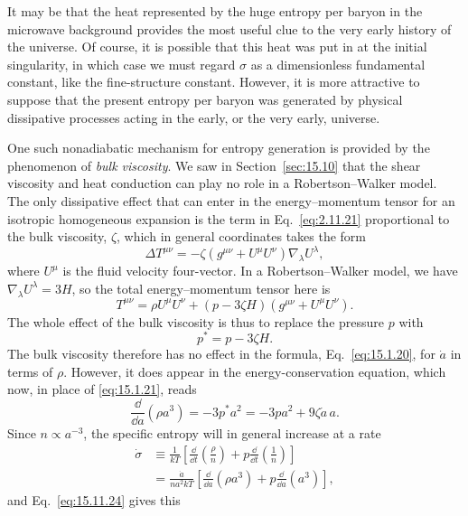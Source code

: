 It may be that the heat represented by the huge entropy per baryon in the
microwave background provides the most useful clue to the very early history of
the universe. Of course, it is possible that this heat was put in at the initial
singularity, in which case we must regard \(\sigma\) as a dimensionless
fundamental constant, like the fine-structure constant. However, it is more
attractive to suppose that the present entropy per baryon was generated by
physical dissipative processes acting in the early, or the very early,
universe.

One such nonadiabatic mechanism for entropy generation is provided by the
phenomenon of \emph{bulk viscosity}. We saw in
Section~\ref{sec:15.10} that the shear viscosity and heat conduction can play
no role in a Robertson--Walker model. The only dissipative effect that can
enter in the energy--momentum tensor for an isotropic homogeneous expansion is
the term in Eq.~\eqref{eq:2.11.21} proportional to the bulk viscosity,
\(\zeta\), which in general coordinates takes the form
\[
  \Delta T^{\mu\nu}
  =
  -\zeta(g^{\mu\nu}+U^\mu U^\nu)\nabla_\lambda U^\lambda,
\]
where \(U^\mu\) is the fluid velocity four-vector. In a
Robertson--Walker model, we have \(\nabla_\lambda U^\lambda=3H\), so the
total energy--momentum tensor here is
\[
  T^{\mu\nu}
  =
  \rho U^\mu U^\nu
  +(p-3\zeta H)(g^{\mu\nu}+U^\mu U^\nu).
\]
The whole effect of the bulk viscosity is thus to replace the pressure \(p\)
with
\begin{equation}
  p^*=p-3\zeta H.
  \tag{15.11.23}\label{eq:15.11.23}
\end{equation}
The bulk viscosity therefore has no effect in the formula,
Eq.~\eqref{eq:15.1.20}, for \(\dot a\) in terms of \(\rho\). However, it
does appear in the energy-conservation equation, which now, in place of
\eqref{eq:15.1.21}, reads
\begin{equation}
  \frac{\dd}{\dd a}(\rho a^3)
  =
  -3p^*a^2
  =
  -3pa^2+9\zeta\dot a\,a.
  \tag{15.11.24}\label{eq:15.11.24}
\end{equation}
Since \(n\propto a^{-3}\), the specific entropy will in general increase at
a rate
\[
  \begin{aligned}
  \dot\sigma
  &\equiv
  \frac1{kT}
  \left[
    \frac{\dd}{\dd t}\left(\frac\rho n\right)
    +p\frac{\dd}{\dd t}\left(\frac1n\right)
  \right]\\
  &=
  \frac{\dot a}{na^2kT}
  \left[
    \frac{\dd}{\dd a}(\rho a^3)
    +p\frac{\dd}{\dd a}(a^3)
  \right],
  \end{aligned}
\]
and Eq.~\eqref{eq:15.11.24} gives this
